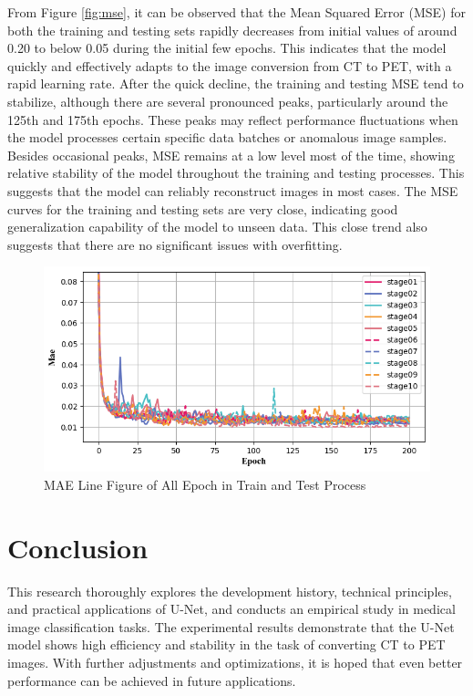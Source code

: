 \documentclass[twocolumn]{article}
\begin{document}
From Figure \ref{fig:mse}, it can be observed that the Mean Squared Error (MSE) for both the training and testing sets rapidly decreases from initial values of around 0.20 to below 0.05 during the initial few epochs. This indicates that the model quickly and effectively adapts to the image conversion from CT to PET, with a rapid learning rate. After the quick decline, the training and testing MSE tend to stabilize, although there are several pronounced peaks, particularly around the 125th and 175th epochs. These peaks may reflect performance fluctuations when the model processes certain specific data batches or anomalous image samples. Besides occasional peaks, MSE remains at a low level most of the time, showing relative stability of the model throughout the training and testing processes. This suggests that the model can reliably reconstruct images in most cases. The MSE curves for the training and testing sets are very close, indicating good generalization capability of the model to unseen data. This close trend also suggests that there are no significant issues with overfitting.

\begin{figure}[h]
	\centering
	\includegraphics[width=1.0\linewidth]{u-net/lung/csv_img_in_1_img_8_4/mae_comparison}
	\caption[mae]{MAE Line Figure of All Epoch in Train and Test Process}
	\label{fig:mae}
\end{figure}


\section{Conclusion}
This research thoroughly explores the development history, technical principles, and practical applications of U-Net, and conducts an empirical study in medical image classification tasks. The experimental results demonstrate that the U-Net model shows high efficiency and stability in the task of converting CT to PET images. With further adjustments and optimizations, it is hoped that even better performance can be achieved in future applications.
\end{document}
